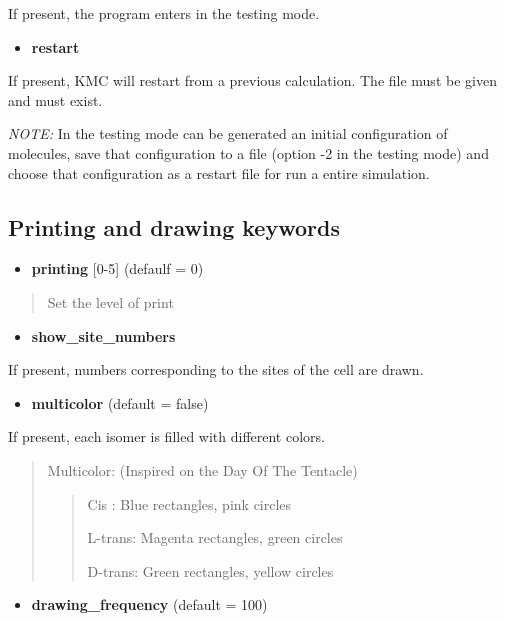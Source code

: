 \documentclass[letterpaper,10pt,english]{sphinxmanual}
\begin{document}
If present, the program enters in the testing mode.
\begin{itemize}
\item {} 
\textbf{restart} 

\end{itemize}

If present, KMC will restart from a previous calculation. The file
  must be given and must exist.

\emph{NOTE:} In the testing mode can be generated an initial configuration of
molecules, save that configuration to a file (option -2 in the testing mode)
and choose that configuration as a restart file for run a entire simulation.


\subsection{Printing and drawing keywords}
\label{keywords:printing-and-drawing-keywords}\begin{itemize}
\item {} 
\textbf{printing}  {[}0-5{]} (defaulf = 0)

\end{itemize}
\begin{quote}

Set the level of print
\end{quote}
\begin{itemize}
\item {} 
\textbf{show\_site\_numbers}

\end{itemize}

If present, numbers corresponding to the sites of the cell are drawn.
\begin{itemize}
\item {} 
\textbf{multicolor}  (default = false)

\end{itemize}

If present, each isomer is filled with different colors.
\begin{quote}

Multicolor: (Inspired on the Day Of The Tentacle)
\begin{quote}

Cis : Blue rectangles, pink circles

L-trans: Magenta rectangles, green circles

D-trans: Green rectangles, yellow circles
\end{quote}
\end{quote}
\begin{itemize}
\item {} 
\textbf{drawing\_frequency}   (default = 100)

\end{itemize}
\end{document}
